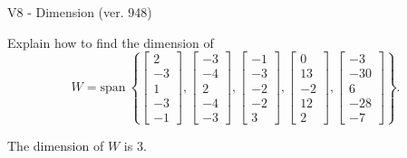 \begin{exercise}
  \begin{exerciseTitle}V8 - Dimension (ver. 948)\end{exerciseTitle}
  \begin{exerciseStatement}
    Explain how to find the dimension of 
\[W=\mathrm{span}\ \left\{\left[\begin{array}{r}
2 \\
-3 \\
1 \\
-3 \\
-1
\end{array}\right] , \left[\begin{array}{r}
-3 \\
-4 \\
2 \\
-4 \\
-3
\end{array}\right] , \left[\begin{array}{r}
-1 \\
-3 \\
-2 \\
-2 \\
3
\end{array}\right] , \left[\begin{array}{r}
0 \\
13 \\
-2 \\
12 \\
2
\end{array}\right] , \left[\begin{array}{r}
-3 \\
-30 \\
6 \\
-28 \\
-7
\end{array}\right]\right\}.\]



  \end{exerciseStatement}
  \begin{exerciseAnswer}
   The dimension of \(W\) is  \(3\).
  


  \end{exerciseAnswer}
\end{exercise}